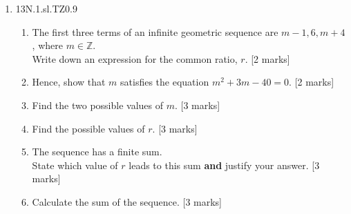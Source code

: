 \documentclass[12pt, twoside]{article}
\begin{document}
\begin{enumerate}
  \item 13N.1.sl.TZ0.9
  \begin{enumerate}
    \item The first three terms of an infinite geometric sequence are $m-1, 6, m+4$, where $m \in \mathbb{Z}$.\\
    Write down an expression for the common ratio, $r$. [2 marks]
    \item Hence, show that $m$ satisfies the equation $m^2+3m-40=0$. [2 marks]
    \item Find the two possible values of $m$. [3 marks]
    \item Find the possible values of $r$. [3 marks]
    \item The sequence has a finite sum.\\
    State which value of $r$ leads to this sum \textbf{and} justify your answer. [3 marks]
    \item Calculate the sum of the sequence. [3 marks]
  \end{enumerate}

\end{enumerate}
\end{document}
